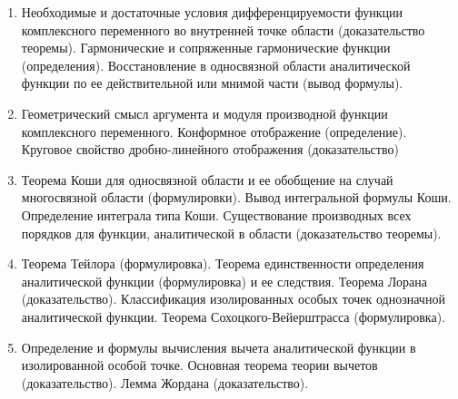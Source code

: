 % 
%

\begin{enumerate}

\item Необходимые и достаточные условия дифференцируемости функции комплексного переменного во внутренней точке области (доказательство теоремы). Гармонические и сопряженные гармонические функции (определения). Восстановление в односвязной области  аналитической функции по ее действительной или мнимой части (вывод формулы). 

\item Геометрический смысл  аргумента и модуля  производной функции комплексного переменного.
Конформное отображение (определение). Круговое свойство дробно-линейного отображения (доказательство)

\item Теорема Коши для односвязной области и ее обобщение на случай многосвязной области (формулировки). Вывод интегральной формулы Коши. Определение интеграла типа Коши. Существование производных всех порядков для функции, аналитической в области (доказательство теоремы).

\item Теорема Тейлора (формулировка). Теорема единственности определения аналитической функции (формулировка) и ее следствия. Теорема Лорана (доказательство). Классификация изолированных особых точек однозначной аналитической функции. Теорема Сохоцкого-Вейерштрасса (формулировка).

\item Определение и формулы вычисления вычета  аналитической функции в изолированной особой точке. Основная теорема теории вычетов (доказательство). Лемма Жордана (доказательство).

\end{enumerate}
